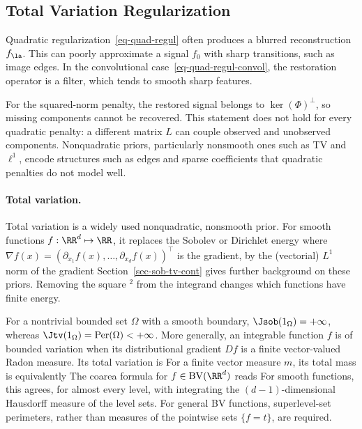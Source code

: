 \subsection{Total Variation Regularization}
\label{sec-tv-regul}

Quadratic regularization~\eqref{eq-quad-regul} often produces a blurred reconstruction $f_\la$. This can poorly approximate a signal $f_0$ with sharp transitions, such as image edges.
%
In the convolutional case~\eqref{eq-quad-regul-convol}, the restoration operator is a filter, which tends to smooth sharp features.

For the squared-norm penalty, the restored signal belongs to $\ker(\Phi)^\bot$, so missing components cannot be recovered. This statement does not hold for every quadratic penalty: a different matrix $L$ can couple observed and unobserved components. Nonquadratic priors, particularly nonsmooth ones such as TV and $\ell^1$, encode structures such as edges and sparse coefficients that quadratic penalties do not model well.

\paragraph{Total variation.}

Total variation is a widely used nonquadratic, nonsmooth prior. For smooth functions $f : \RR^d \mapsto \RR$, it replaces the Sobolev or Dirichlet energy
where $\nabla f(x) = (\partial_{x_1} f(x), \ldots, \partial_{x_d} f(x))^\top$ is the gradient, by the (vectorial) $L^1$ norm of the gradient
Section~\ref{sec-sob-tv-cont} gives further background on these priors.
%
Removing the square $^2$ from the integrand changes which functions have finite energy.

For a nontrivial bounded set $\Omega$ with a smooth boundary, $\Jsob(1_\Omega)=+\infty$, whereas $\Jtv(1_\Omega)=\operatorname{Per}(\Omega)<+\infty$. More generally, an integrable function $f$ is of bounded variation when its distributional gradient $Df$ is a finite vector-valued Radon measure. Its total variation is
For a finite vector measure $m$, its total mass is equivalently
The coarea formula for $f\in\mathrm{BV}(\RR^d)$ reads
For smooth functions, this agrees, for almost every level, with integrating the $(d-1)$-dimensional Hausdorff measure of the level sets. For general BV functions, superlevel-set perimeters, rather than measures of the pointwise sets $\{f=t\}$, are required.

